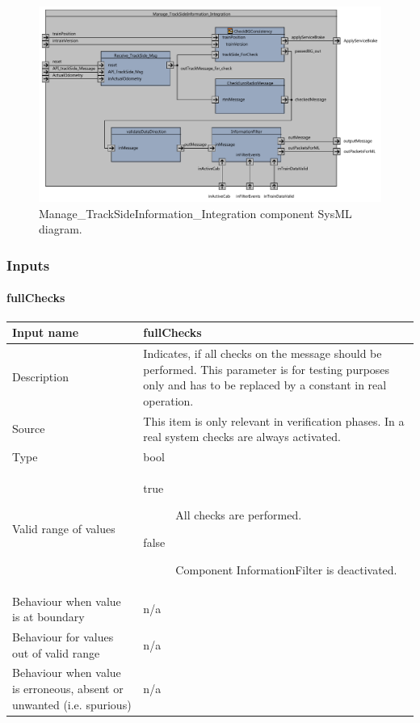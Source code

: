 \begin{figure}[H]
\center
\includegraphics[width=\textwidth]{./images/F2_1_Manage_Trackside_Information_Integration_SysML.pdf}
\caption{Manage\_TrackSideInformation\_Integration component SysML diagram.}\label{f:receiveAndCheckConsistencyArch}
\end{figure}


\subsubsection{Inputs}\label{s:Manage_Trackside_inputs}

\paragraph{fullChecks}

\begin{longtable}{p{}p{}}
\toprule
Input name				& fullChecks \\
\midrule
Description				& Indicates, if all checks on the message should be performed. This parameter is for testing purposes only and has to be replaced by a constant in real operation.\\
\midrule
Source					& This item is only relevant in verification phases. In a real system checks are always activated. \\ 
\midrule
Type					& bool \\
\midrule
Valid range of values	& 
\begin{description}
\item[true] All checks are performed.
\item[false] Component InformationFilter is deactivated.
\end{description} \\
\midrule
Behaviour when value is at boundary	& n/a \\
\midrule
Behaviour for values out of valid range	& n/a \\
\midrule
Behaviour when value is erroneous, absent or unwanted (i.e. spurious) & n/a\\
\bottomrule
\end{longtable}


